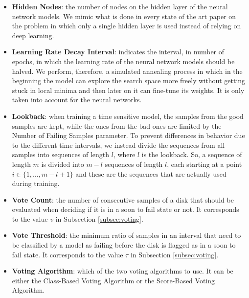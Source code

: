 \begin{itemize}
  \item \textbf{Hidden Nodes}: the number of nodes on the hidden layer of the neural network models.
  We mimic what is done in every state of the art paper on the problem in which only a single hidden layer is used instead of relying on deep learning.

  \item \textbf{Learning Rate Decay Interval}: indicates the interval, in number of epochs, in which the learning rate of the neural network models should be halved.
  We perform, therefore, a simulated annealing process in which in the beginning the model can explore the search space more freely without getting stuck in local minima and then later on it can fine-tune its weights.
  It is only taken into account for the neural networks.

  \item \textbf{Lookback}: when training a time sensitive model, the samples from the good samples are kept, while the ones from the bad ones are limited by the Number of Failing Samples parameter.
  To prevent differences in behavior due to the different time intervals, we instead divide the sequences from all samples into sequences of length $l$, where $l$ is the lookback.
  So, a sequence of length $m$ is divided into $m-l$ sequences of length $l$, each starting at a point $i \in \{1,\dots,m-l+1\}$ and these are the sequences that are actually used during training.

  \item \textbf{Vote Count}: the number of consecutive samples of a disk that should be evaluated when deciding if it is in a soon to fail state or not.
  It corresponds to the value $v$ in Subsection \ref{subsec:voting}.

  \item \textbf{Vote Threshold}: the minimum ratio of samples in an interval that need to be classified by a model as failing before the disk is flagged as in a soon to fail state.
  It corresponds to the value $\tau$ in Subsection \ref{subsec:voting}.

  \item \textbf{Voting Algorithm}: which of the two voting algorithms to use.
  It can be either the Class-Based Voting Algorithm or the Score-Based Voting Algorithm.
  
\end{itemize}